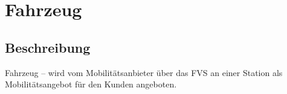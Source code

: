 
\section{Fahrzeug}

\subsection{Beschreibung}
Fahrzeug – wird vom Mobilitätsanbieter über das FVS an einer Station als Mobilitätsangebot für den Kunden angeboten.


